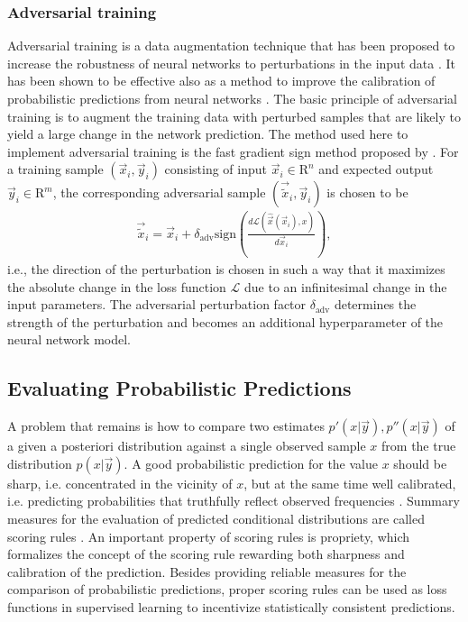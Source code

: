 \documentclass[journal abbreviation, manuscript]{copernicus}
\begin{document}
\subsubsection{Adversarial training}
\label{sec:adversarial_training}

  Adversarial training is a data augmentation technique that has been proposed
  to increase the robustness of neural networks to perturbations in the input
  data \citep{goodfellow_2}. It has been shown to be effective also as a method
  to improve the calibration of probabilistic predictions from neural networks
  \citep{lakshminarayanan}. The basic principle of adversarial training is to
  augment the training data with perturbed samples that are likely to
  yield a large change in the network prediction. The method used here to
  implement adversarial training  is the fast gradient sign method
  proposed by \citet{goodfellow_2}. For a training sample $(\vec{x}_i, \vec{y}_i)$
  consisting of input $\vec{x}_i \in \mathrm{R}^{n}$ and expected output
  $\vec{y}_i \in \mathrm{R}^m$, the corresponding adversarial sample
  $(\vec{\tilde{x}}_i, \vec{y}_i)$ is chosen to be
    \begin{align}\label{eq:adversarial_training}
      \vec{\tilde{x}}_i = \vec{x}_i + \delta_\text{adv} \text{sign} \left (
     \frac{d \mathcal{L}(\hat{\vec{x}}(\vec{x}_i), x)}{d\vec{x}_i}
      \right ),
    \end{align}
    i.e., the direction of the perturbation is chosen in such a way that
    it maximizes the absolute change in the loss function $\mathcal{L}$ due
    to an infinitesimal change in the input parameters. The adversarial
    perturbation factor $\delta_{\text{adv}}$ determines the strength of the perturbation
    and becomes an additional hyperparameter of the neural network model.

\subsection{Evaluating Probabilistic Predictions}

A problem that remains is how to compare two estimates $p'(x | \vec{y}), p''(x
| \vec{y})$ of a given a posteriori distribution against a single observed sample
$x$ from the true distribution $p(x | \vec{y})$. A good
probabilistic prediction for the value $x$ should be sharp, i.e. concentrated in
the vicinity of $x$, but at the same time well calibrated, i.e. predicting
probabilities that truthfully reflect observed frequencies \citep{gneiting_2}.
Summary measures for the evaluation of predicted conditional distributions are
called scoring rules \citep{gneiting}. An important property of scoring rules
is propriety, which formalizes the concept of the scoring rule rewarding both
sharpness and calibration of the prediction. Besides providing reliable
measures for the comparison of probabilistic predictions, proper scoring rules
can be used as loss functions in supervised learning to incentivize
statistically consistent predictions.
\end{document}
